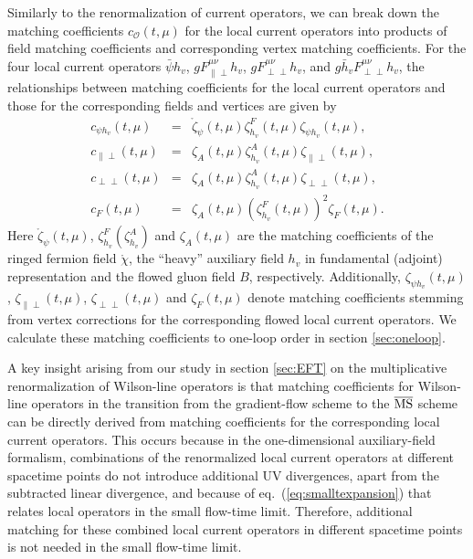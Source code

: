 Similarly to the renormalization of current operators, we can break down the matching coefficients $c_{\mathcal{O}}(t, \mu)$ for the local current operators into products of field matching coefficients and corresponding vertex matching coefficients. For the four local current operators $\bar{\psi} h_v$, $gF^{\mu\nu}_{\|\perp}h_v$, $gF^{\mu\nu}_{\perp\perp}h_v$, and $g\bar{h}_vF^{\mu\nu}_{\perp\perp}h_v$, the relationships between matching coefficients for the local current operators and those for the corresponding fields and vertices are given by
\begin{subequations}
\label{eq:operatorrelations}
\begin{eqnarray}
c_{\psi h_v} (t,\mu) &=& \mathring{\zeta}_{\psi}(t,\mu)\zeta_{h_v}^F(t,\mu)\zeta_{\psi h_v}(t,\mu),\\
c_{\|\perp} (t,\mu)&=& \zeta_{A}(t,\mu)\zeta_{h_v}^A(t,\mu)\zeta_{\|\perp}(t,\mu),\\
c_{\perp\perp}(t,\mu) &=& \zeta_{A}(t,\mu)\zeta_{h_v}^A(t,\mu)\zeta_{\perp\perp}(t,\mu),\\
c_F(t,\mu) &=& \zeta_{A}(t,\mu)(\zeta^F_{h_v}(t,\mu))^2\zeta_F(t,\mu).
\end{eqnarray}
\end{subequations}
Here $ \mathring{\zeta}_{\psi}(t,\mu)$, $\zeta_{h_v}^F (\zeta_{h_v}^A)$ and $\zeta_{A}(t,\mu)$ are the matching coefficients of the ringed fermion field $\mathring{\chi}$,  the ``heavy” auxiliary field $h_v$ in fundamental (adjoint) representation and the flowed gluon field $B$, respectively. Additionally, $\zeta_{\psi h_v}(t,\mu)$, $\zeta_{\|\perp}(t,\mu)$, $\zeta_{\perp\perp}(t,\mu)$ and $\zeta_F(t,\mu)$ denote matching coefficients stemming from vertex corrections for the corresponding flowed local current operators. We calculate these matching coefficients to one-loop order in section \ref{sec:oneloop}.

A key insight arising from our study in section \ref{sec:EFT} on the multiplicative renormalization of Wilson-line operators is that matching coefficients for Wilson-line operators in the transition from the gradient-flow scheme to the $\overline{\rm MS}$ scheme can be directly derived from matching coefficients for the corresponding local current operators. This occurs because in the one-dimensional auxiliary-field formalism, combinations of the renormalized local current operators at different spacetime points do not introduce additional UV divergences, apart from the subtracted linear divergence, and because of eq.~(\ref{eq:smalltexpansion}) that relates local operators in the small flow-time limit. Therefore, additional matching for these combined local current operators in different spacetime points is not needed in the small flow-time limit.




